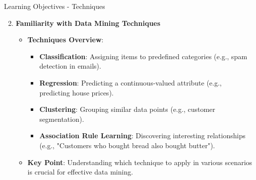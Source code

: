 \documentclass[aspectratio=169]{beamer}
\begin{document}
\begin{frame}[fragile]{Learning Objectives - Techniques}
    \begin{enumerate}
        \setcounter{enumi}{1}
        \item \textbf{Familiarity with Data Mining Techniques}
        \begin{itemize}
            \item \textbf{Techniques Overview}:
            \begin{itemize}
                \item \textbf{Classification}: Assigning items to predefined categories (e.g., spam detection in emails).
                \item \textbf{Regression}: Predicting a continuous-valued attribute (e.g., predicting house prices).
                \item \textbf{Clustering}: Grouping similar data points (e.g., customer segmentation).
                \item \textbf{Association Rule Learning}: Discovering interesting relationships (e.g., "Customers who bought bread also bought butter").
            \end{itemize}
            \item \textbf{Key Point}: Understanding which technique to apply in various scenarios is crucial for effective data mining.
        \end{itemize}
    \end{enumerate}
\end{frame}
\end{document}
